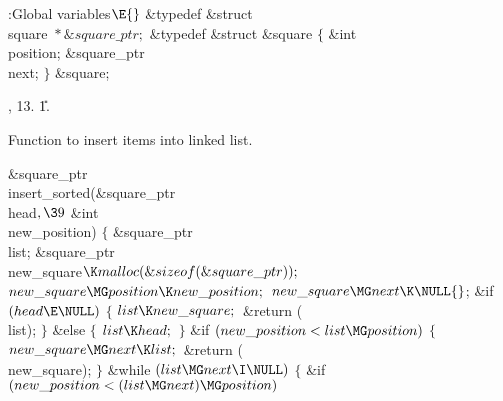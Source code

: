 \Y\B\4:Global variables\X${}\E{}$\6
\&{typedef} \&{struct} \\{square} ${}{*}\&{square\_ptr};{}$\6
\&{typedef} \&{struct} \&{square} ${}\{{}$\1\6
\&{int} \\{position};\6
\&{square\_ptr} \\{next};\2\6
${}\}{}$ \&{square};\par
{}, 13.
\U1.\fi

Function to insert items into linked list.

\Y\B\&{square\_ptr} \\{insert\_sorted}(\&{square\_ptr} \\{head}${},\39{}$%
\&{int} \\{new\_position})\1\1\2\2\6
${}\{{}$\1\6
\&{square\_ptr} \\{list};\6
\&{square\_ptr} \\{new\_square}${}\K\\{malloc}(\&{sizeof}(\&{square\_ptr}));{}$%
\7
${}\\{new\_square}\MG\\{position}\K\\{new\_position};{}$\6
${}\\{new\_square}\MG\\{next}\K\NULL{}$;\6
\&{if} ${}(\\{head}\E\NULL){}$\5
${}\{{}$\1\6
${}\\{list}\K\\{new\_square};{}$\6
\&{return} (\\{list});\6
\4${}\}{}$\2\6
\&{else}\5
${}\{{}$\1\6
${}\\{list}\K\\{head};{}$\6
\4${}\}{}$\2\6
\&{if} ${}(\\{new\_position}<\\{list}\MG\\{position}){}$\5
${}\{{}$\1\6
${}\\{new\_square}\MG\\{next}\K\\{list};{}$\6
\&{return} (\\{new\_square});\6
\4${}\}{}$\2\6
\&{while} ${}(\\{list}\MG\\{next}\I\NULL){}$\5
${}\{{}$\1\6
\&{if} ${}(\\{new\_position}<(\\{list}\MG\\{next})\MG\\{position}){}$\5
